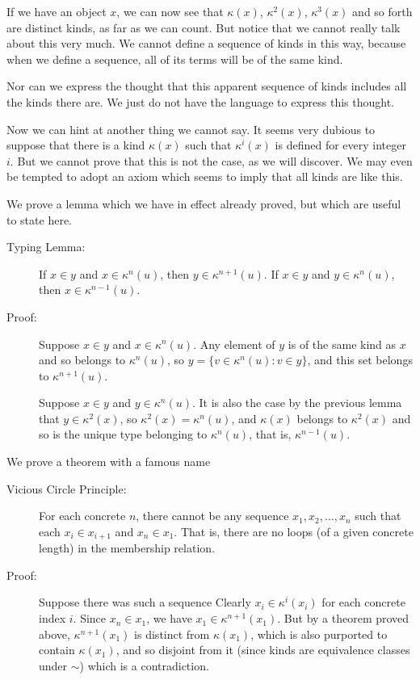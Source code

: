 \documentclass[12pt]{article}
\begin{document}
If we have an object $x$, we can now see that $\kappa(x)$, $\kappa^2(x)$, $\kappa^3(x)$ and so forth are distinct kinds, as far as we can count.  But notice that we cannot really talk about this very much.  We cannot define a sequence of kinds in this way, because when we define a sequence, all of its terms will be of the same kind.

Nor can we express the thought that this apparent sequence of kinds includes all the kinds there are.  We just do not have the language to express this thought.



Now we can hint at another thing we cannot say.  It seems very dubious to suppose that there is a kind $\kappa(x)$ such that $\kappa^i(x)$ is defined for every integer $i$.  But we cannot prove that this is not the case, as we will discover.   We may even be tempted to adopt an axiom which seems to imply that all kinds are like this.

We prove a lemma which we have in effect already proved, but which are useful to state here.

\begin{description}

\item[Typing Lemma:]  If $x \in y$ and $x \in \kappa^n(u)$, then $y \in \kappa^{n+1}(u)$.  If $x \in y$ and $y \in \kappa^n(u)$, then $x \in \kappa^{n-1}(u)$.

\item[Proof:]  Suppose $x \in y$ and $x \in \kappa^n(u)$.  Any element of $y$ is of the same kind as
$x$ and so belongs to $\kappa^n(u)$, so $y = \{v \in \kappa^n(u):v \in y\}$, and this set belongs to $\kappa^{n+1}(u)$.

Suppose $x \in y$ and $y \in \kappa^n(u)$.  It is also the case by the previous lemma that $y \in \kappa^2(x)$, so $\kappa^2(x) = \kappa^n(u)$, and $\kappa(x)$ belongs to $\kappa^2(x)$ and so is the unique type belonging to $\kappa^n(u)$, that is, $\kappa^{n-1}(u)$.





\end{description}

We prove a theorem with a famous name

\begin{description}

\item[Vicious Circle Principle:]  For each concrete $n$, there cannot be any sequence $x_1,x_2,\ldots,x_n$ such that each $x_i \in x_{i+1}$ and $x_n \in x_1$.  That is, there are no loops (of a given concrete length) in the membership relation.

\item[Proof:]  Suppose there was such a sequence Clearly $x_i \in \kappa^i(x_i)$ for each concrete index $i$.  Since $x_n \in x_1$, we have $x_1 \in \kappa^{n+1}(x_1)$.  But by a theorem proved above,
$\kappa^{n+1}(x_1)$ is distinct from $\kappa(x_1)$, which is also purported to contain $\kappa(x_1)$, and so disjoint from it (since kinds are equivalence classes under $\sim$) which is a contradiction.

\end{description}
\end{document}
